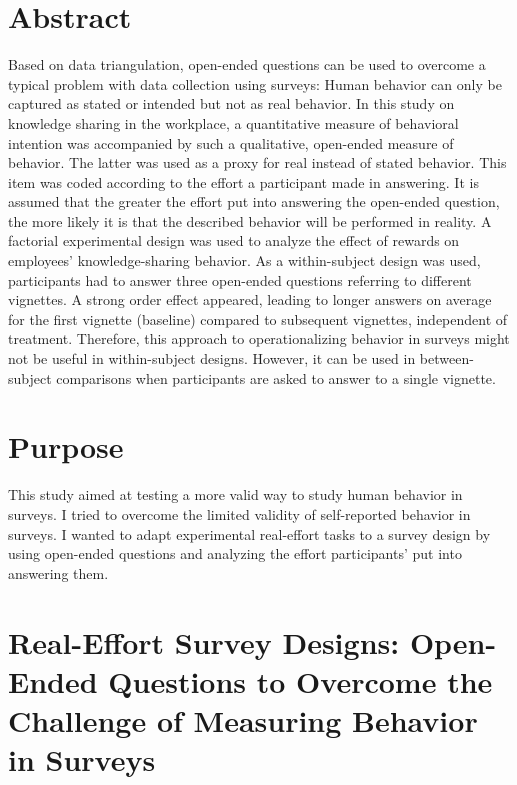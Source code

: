 \documentclass[twocolumn, serif, empirical, authordate]{jote-article}
\begin{document}
\section*{Abstract}
\label{sec:Abstract}

Based on data triangulation, open-ended questions can be used to overcome a typical problem with data collection using surveys: Human behavior can only be captured as stated or intended but not as real behavior. In this study on knowledge sharing in the workplace, a quantitative measure of behavioral intention was accompanied by such a qualitative, open-ended measure of behavior. The latter was used as a proxy for real instead of stated behavior. This item was coded according to the effort a participant made in answering. It is assumed that the greater the effort put into answering the open-ended question, the more likely it is that the described behavior will be performed in reality. A factorial experimental design was used to analyze the effect of rewards on employees' knowledge-sharing behavior. As a within-subject design was used, participants had to answer three open-ended questions referring to different vignettes. A strong order effect appeared, leading to longer answers on average for the first vignette (baseline) compared to subsequent vignettes, independent of treatment. Therefore, this approach to operationalizing behavior in surveys might not be useful in within-subject designs. However, it can be used in between-subject comparisons when participants are asked to answer to a single vignette.


\section*{Purpose}
\label{sec:Purpose}

This study aimed at testing a more valid way to study human behavior in surveys. I tried to overcome the limited validity of self-reported behavior in surveys. I wanted to adapt experimental real-effort tasks to a survey design by using open-ended questions and analyzing the effort participants' put into answering them.


\section*{Real-Effort Survey Designs: Open-Ended Questions to Overcome the Challenge of Measuring Behavior in Surveys}
\label{sec:Real-Effort Survey Designs: Open-Ended Questions to Overcome the Challenge of Measuring Behavior in Surveys}
\end{document}
